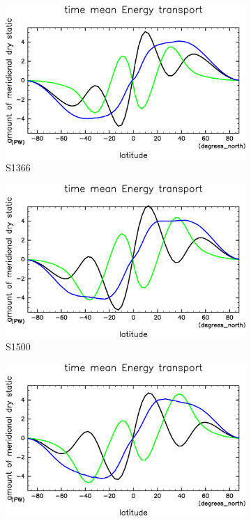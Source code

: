 \documentclass[body]{subfiles}
\begin{document}
\begin{figure}[t]
	\centering
	\begin{subfigure}{.4\textwidth}
		\centering
		\includegraphics[width=\textwidth]{S1366/EngyFlx,time=14600:14965-crop-rotate.pdf}
		\caption{S1366}\label{EnFlxS1366}
	\end{subfigure}
	\begin{subfigure}{.4\textwidth}
		\centering
		\includegraphics[width=\textwidth]{S1500/EngyFlx,time=3650:4015-crop-rotate.pdf}
		\caption{S1500}\label{EnFlxS1500}
	\end{subfigure}
	\begin{subfigure}{.4\textwidth}
		\centering
		\includegraphics[width=\textwidth]{S1600/EngyFlx,time=3650:4015-crop-rotate.pdf}

\end{subfigure}
\end{figure}
\end{document}
